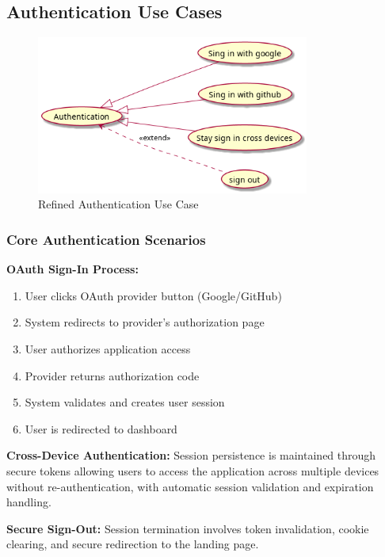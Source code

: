 \subsection{Authentication Use Cases}
\begin{figure}[H]
    \centering
    \includegraphics[width=0.8\textwidth]{conception/SprintII/use_case_diagrams/refined_use_case_feature_auth.png}
    \caption{Refined Authentication Use Case}
    \label{fig:refined_auth_usecase}
\end{figure}

\subsubsection{Core Authentication Scenarios}

\textbf{OAuth Sign-In Process:}
\begin{enumerate}
    \item User clicks OAuth provider button (Google/GitHub)
    \item System redirects to provider's authorization page
    \item User authorizes application access
    \item Provider returns authorization code
    \item System validates and creates user session
    \item User is redirected to dashboard
\end{enumerate}

\textbf{Cross-Device Authentication:}
Session persistence is maintained through secure tokens allowing users to access the application across multiple devices without re-authentication, with automatic session validation and expiration handling.

\textbf{Secure Sign-Out:}
Session termination involves token invalidation, cookie clearing, and secure redirection to the landing page.

